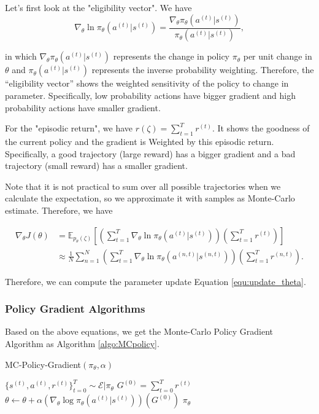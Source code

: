\documentclass[11pt]{article}
\begin{document}
Let's first look at the "eligibility vector". We have
$$\nabla_\theta \ln \pi_\theta(a^{(t)}|s^{(t)}) = \frac{\nabla_\theta  \pi_\theta(a^{(t)}|s^{(t)})}{\pi_\theta(a^{(t)}|s^{(t)})},$$

in which $\nabla_\theta  \pi_\theta(a^{(t)}|s^{(t)})$ represents the change in policy $\pi_\theta$ per unit change in $\theta$ and $\pi_\theta(a^{(t)}|s^{(t)})$ represents the inverse probability weighting. Therefore, the “eligibility vector” shows the weighted sensitivity of the policy to change in parameter. Specifically, low probability actions have bigger gradient and high probability actions have smaller gradient.
  

For the "episodic return", we have $r(\zeta) = \sum_{t=1}^T r^{(t)}$. It shows the goodness of the current policy and the gradient is Weighted by this episodic return. Specifically, a good trajectory (large reward) has a bigger gradient and a bad trajectory (small reward) has a smaller gradient.

Note that it is not practical to sum over all possible trajectories when we calculate the expectation, so we approximate it with samples as Monte-Carlo estimate. Therefore, we have 

\begin{equation}
\begin{split}
\nabla_{\theta} J(\theta) & = \mathbb{E}_{p_\theta(\zeta)}[(\sum_{t=1}^T \nabla_\theta \ln \pi_\theta(a^{(t)}|s^{(t)})) (\sum_{t=1}^T r^{(t)})]\\
&\approx \frac{1}{N} \sum_{n=1}^{N}(\sum_{t=1}^T \nabla_\theta \ln \pi_\theta(a^{(n,t)}|s^{(n,t)}))(\sum_{t=1}^T r^{(n,t)}).
\end{split}
\end{equation}

Therefore, we can compute the parameter update Equation \ref{equ:update_theta}.

\subsubsection{Policy Gradient Algorithms}

Based on the above equations, we get the Monte-Carlo Policy Gradient Algorithm as Algorithm \ref{algo:MCpolicy}.
\begin{algorithm}[H]
\caption{MC-Policy-Gradient$(\pi_\theta,\alpha)$}
\label{algo:MCpolicy}
\begin{algorithmic}[1]
\STATE $\{s^{(t)},a^{(t)},r^{(t)}\}_{t=0}^T \sim \mathcal{E}|\pi_\theta $
\STATE $G^{(0)} = \sum_{t=0}^T r^{(t)}$
\STATE $\theta \leftarrow \theta+\alpha(\nabla_{\theta}\log{\pi_\theta(a^{(t)}|s^{(t)})})(G^{(0)})$
\ENDFOR
\ENDFOR 
\RETURN $\pi_\theta$
\end{algorithmic}
\end{algorithm}
\end{document}

